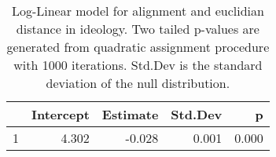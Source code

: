 \begin{table}[ht]
\centering
\begin{tabular}{rrrrr}
  \hline
 & Intercept & Estimate & Std.Dev & p \\ 
  \hline
1 & 4.302 & -0.028 & 0.001 & 0.000 \\ 
   \hline
\end{tabular}
\caption{Log-Linear model for alignment and euclidian
distance in ideology. Two tailed p-values are generated from quadratic
assignment procedure with 1000 iterations. Std.Dev is the standard
deviation of the null distribution.} 
\label{tab:ideology_regs}
\end{table}
